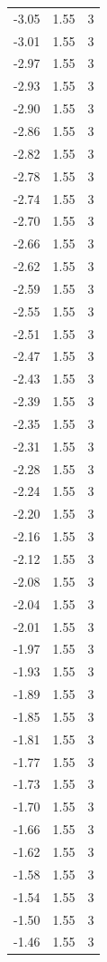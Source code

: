 \begin{longtable}{lrr}
  -3.05 & 1.55 & 3 \\
  -3.01 & 1.55 & 3 \\
  -2.97 & 1.55 & 3 \\
  -2.93 & 1.55 & 3 \\
  -2.90 & 1.55 & 3 \\
  -2.86 & 1.55 & 3 \\
  -2.82 & 1.55 & 3 \\
  -2.78 & 1.55 & 3 \\
  -2.74 & 1.55 & 3 \\
  -2.70 & 1.55 & 3 \\
  -2.66 & 1.55 & 3 \\
  -2.62 & 1.55 & 3 \\
  -2.59 & 1.55 & 3 \\
  -2.55 & 1.55 & 3 \\
  -2.51 & 1.55 & 3 \\
  -2.47 & 1.55 & 3 \\
  -2.43 & 1.55 & 3 \\
  -2.39 & 1.55 & 3 \\
  -2.35 & 1.55 & 3 \\
  -2.31 & 1.55 & 3 \\
  -2.28 & 1.55 & 3 \\
  -2.24 & 1.55 & 3 \\
  -2.20 & 1.55 & 3 \\
  -2.16 & 1.55 & 3 \\
  -2.12 & 1.55 & 3 \\
  -2.08 & 1.55 & 3 \\
  -2.04 & 1.55 & 3 \\
  -2.01 & 1.55 & 3 \\
  -1.97 & 1.55 & 3 \\
  -1.93 & 1.55 & 3 \\
  -1.89 & 1.55 & 3 \\
  -1.85 & 1.55 & 3 \\
  -1.81 & 1.55 & 3 \\
  -1.77 & 1.55 & 3 \\
  -1.73 & 1.55 & 3 \\
  -1.70 & 1.55 & 3 \\
  -1.66 & 1.55 & 3 \\
  -1.62 & 1.55 & 3 \\
  -1.58 & 1.55 & 3 \\
  -1.54 & 1.55 & 3 \\
  -1.50 & 1.55 & 3 \\
  -1.46 & 1.55 & 3 \\

\end{longtable}
